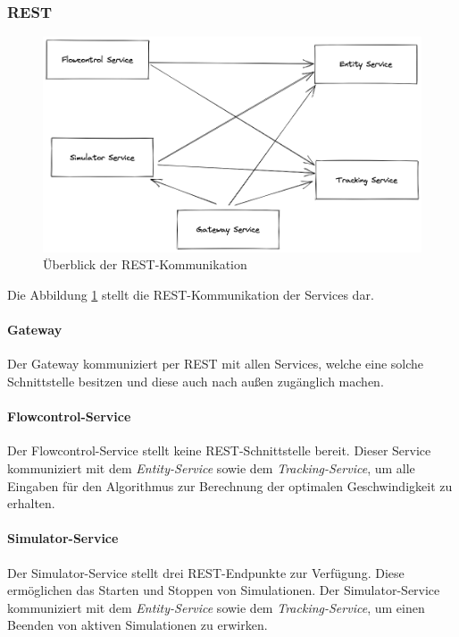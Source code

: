 \subsubsection{REST}

\begin{figure}[h]
	\centering
	\includegraphics[width=1.02\textwidth]{./figures/rest_communication.png}
	\caption{Überblick der REST-Kommunikation}
	\label{fig:kom_rest_overview}
\end{figure}

Die Abbildung \ref{fig:kom_rest_overview} stellt die REST-Kommunikation der Services dar. 

\paragraph{Gateway}

Der Gateway kommuniziert per REST mit allen Services, welche eine solche Schnittstelle besitzen und diese auch nach außen zugänglich machen.

\paragraph{Flowcontrol-Service}

Der Flowcontrol-Service stellt keine REST-Schnittstelle bereit.
Dieser Service kommuniziert mit dem \textit{Entity-Service} sowie dem \textit{Tracking-Service}, um alle Eingaben für den Algorithmus zur Berechnung der optimalen Geschwindigkeit zu erhalten.

\paragraph{Simulator-Service}
Der Simulator-Service stellt drei REST-Endpunkte zur Verfügung.
Diese ermöglichen das Starten und Stoppen von Simulationen.
Der Simulator-Service kommuniziert mit dem \textit{Entity-Service} sowie dem \textit{Track\-ing-Service}, um einen Beenden von aktiven Simulationen zu erwirken.

